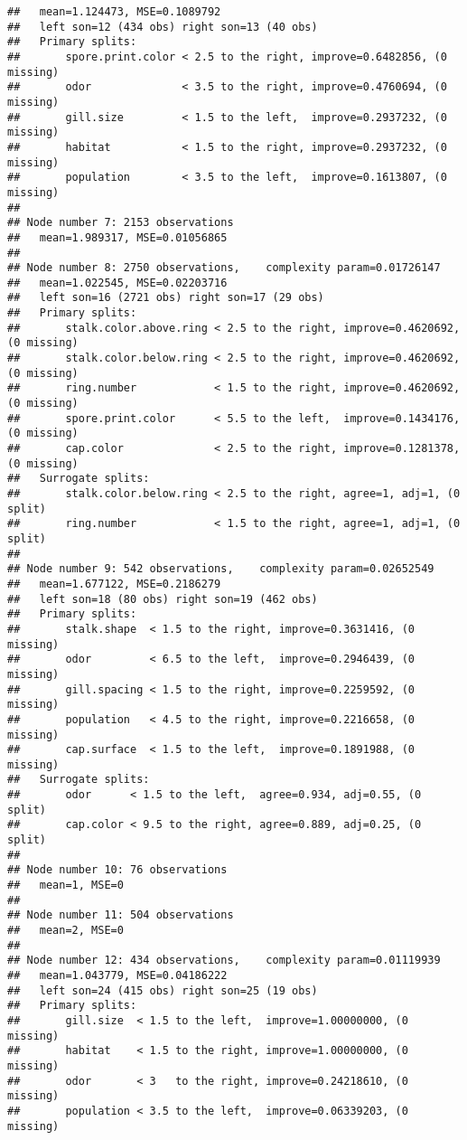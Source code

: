 \documentclass[
]{article}
\begin{document}
\begin{verbatim}
##   mean=1.124473, MSE=0.1089792 
##   left son=12 (434 obs) right son=13 (40 obs)
##   Primary splits:
##       spore.print.color < 2.5 to the right, improve=0.6482856, (0 missing)
##       odor              < 3.5 to the right, improve=0.4760694, (0 missing)
##       gill.size         < 1.5 to the left,  improve=0.2937232, (0 missing)
##       habitat           < 1.5 to the right, improve=0.2937232, (0 missing)
##       population        < 3.5 to the left,  improve=0.1613807, (0 missing)
## 
## Node number 7: 2153 observations
##   mean=1.989317, MSE=0.01056865 
## 
## Node number 8: 2750 observations,    complexity param=0.01726147
##   mean=1.022545, MSE=0.02203716 
##   left son=16 (2721 obs) right son=17 (29 obs)
##   Primary splits:
##       stalk.color.above.ring < 2.5 to the right, improve=0.4620692, (0 missing)
##       stalk.color.below.ring < 2.5 to the right, improve=0.4620692, (0 missing)
##       ring.number            < 1.5 to the right, improve=0.4620692, (0 missing)
##       spore.print.color      < 5.5 to the left,  improve=0.1434176, (0 missing)
##       cap.color              < 2.5 to the right, improve=0.1281378, (0 missing)
##   Surrogate splits:
##       stalk.color.below.ring < 2.5 to the right, agree=1, adj=1, (0 split)
##       ring.number            < 1.5 to the right, agree=1, adj=1, (0 split)
## 
## Node number 9: 542 observations,    complexity param=0.02652549
##   mean=1.677122, MSE=0.2186279 
##   left son=18 (80 obs) right son=19 (462 obs)
##   Primary splits:
##       stalk.shape  < 1.5 to the right, improve=0.3631416, (0 missing)
##       odor         < 6.5 to the left,  improve=0.2946439, (0 missing)
##       gill.spacing < 1.5 to the right, improve=0.2259592, (0 missing)
##       population   < 4.5 to the right, improve=0.2216658, (0 missing)
##       cap.surface  < 1.5 to the left,  improve=0.1891988, (0 missing)
##   Surrogate splits:
##       odor      < 1.5 to the left,  agree=0.934, adj=0.55, (0 split)
##       cap.color < 9.5 to the right, agree=0.889, adj=0.25, (0 split)
## 
## Node number 10: 76 observations
##   mean=1, MSE=0 
## 
## Node number 11: 504 observations
##   mean=2, MSE=0 
## 
## Node number 12: 434 observations,    complexity param=0.01119939
##   mean=1.043779, MSE=0.04186222 
##   left son=24 (415 obs) right son=25 (19 obs)
##   Primary splits:
##       gill.size  < 1.5 to the left,  improve=1.00000000, (0 missing)
##       habitat    < 1.5 to the right, improve=1.00000000, (0 missing)
##       odor       < 3   to the right, improve=0.24218610, (0 missing)
##       population < 3.5 to the left,  improve=0.06339203, (0 missing)

\end{verbatim}
\end{document}
